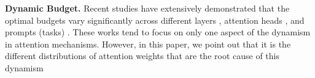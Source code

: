 \textbf{Dynamic Budget.} Recent studies have extensively demonstrated that the optimal budgets vary significantly across different layers \cite{cai2024pyramidkv, yang2024pyramidinfer}, attention heads \cite{feng2025adakvoptimizingkvcache, xiao2024duo, tang2024razorattention}, and prompts (tasks) \cite{zhou2024dynamickv}.
These works tend to focus on only one aspect of the dynamism in attention mechanisms. However, in this paper, we point out that it is the different distributions of attention weights that are the root cause of this dynamism


